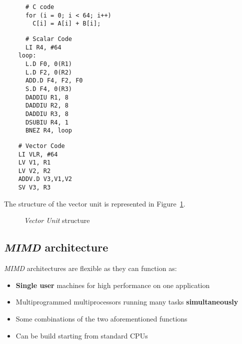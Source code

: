 \documentclass[english]{article}
\begin{document}
\begin{minipage}{0.99\textwidth}
  \bigskip
  \begin{minipage}[t]{0.35\textwidth}
    \begin{verbatim}
      # C code
      for (i = 0; i < 64; i++)
        C[i] = A[i] + B[i];
    \end{verbatim}
  \end{minipage}
  \begin{minipage}[t]{0.3\textwidth}
    \begin{verbatim}
      # Scalar Code
      LI R4, #64
    loop:
      L.D F0, 0(R1)
      L.D F2, 0(R2)
      ADD.D F4, F2, F0
      S.D F4, 0(R3)
      DADDIU R1, 8
      DADDIU R2, 8
      DADDIU R3, 8
      DSUBIU R4, 1
      BNEZ R4, loop
\end{verbatim}
  \end{minipage}
  \begin{minipage}[t]{0.3\textwidth}
    \begin{verbatim}
    # Vector Code
    LI VLR, #64
    LV V1, R1
    LV V2, R2
    ADDV.D V3,V1,V2
    SV V3, R3
  \end{verbatim}
  \end{minipage}
  \bigskip
\end{minipage}

The structure of the vector unit is represented in Figure~\ref{fig:vector-unit-structure}.

\begin{figure}
  \bigskip
  \centering
  \caption{\textit{Vector Unit} structure}
  \label{fig:vector-unit-structure}
  \bigskip
\end{figure}

\subsection{\textit{MIMD} architecture}

\textit{MIMD} architectures are flexible as they can function as:

\begin{itemize}
  \item \textbf{Single user} machines for high performance on one application
  \item Multiprogrammed multiprocessors running many tasks \textbf{simultaneously}
  \item Some combinations of the two aforementioned functions
  \item Can be build starting from standard CPUs
\end{itemize}
\end{document}
